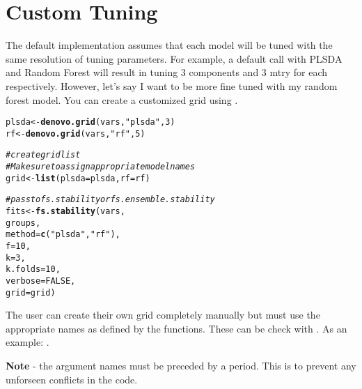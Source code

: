 \documentclass[12pt]{article}\usepackage[]{graphicx}\usepackage[usenames,dvipsnames]{color}
\makeatletter
\newcommand{\hlnum}[1]{\textcolor[rgb]{0.686,0.059,0.569}{#1}}%
\newcommand{\hlstr}[1]{\textcolor[rgb]{0.192,0.494,0.8}{#1}}%
\newcommand{\hlcom}[1]{\textcolor[rgb]{0.678,0.584,0.686}{\textit{#1}}}%
\newcommand{\hlstd}[1]{\textcolor[rgb]{0.345,0.345,0.345}{#1}}%
\newcommand{\hlkwb}[1]{\textcolor[rgb]{0.69,0.353,0.396}{#1}}%
\newcommand{\hlkwc}[1]{\textcolor[rgb]{0.333,0.667,0.333}{#1}}%
\newcommand{\hlkwd}[1]{\textcolor[rgb]{0.737,0.353,0.396}{\textbf{#1}}}%
\newenvironment{kframe}{%
 \def\at@end@of@kframe{}%
 \ifinner\ifhmode%
  \def\at@end@of@kframe{\end{minipage}}%
  \begin{minipage}{\columnwidth}%
 \fi\fi%
 \def\FrameCommand##1{\hskip\@totalleftmargin \hskip-\fboxsep
 \colorbox{shadecolor}{##1}\hskip-\fboxsep
     \hskip-\linewidth \hskip-\@totalleftmargin \hskip\columnwidth}%
 \MakeFramed {\advance\hsize-\width
   \@totalleftmargin\z@ \linewidth\hsize
   \@setminipage}}%
 {\par\unskip\endMakeFramed%
 \at@end@of@kframe}
\newenvironment{knitrout}{}{} %
\makeatother
\begin{document}
\newpage
\maketitle
\section{Custom Tuning}

The default implementation assumes that each model will be tuned with the same
resolution of tuning parameters.  For example, a default call with PLSDA and 
Random Forest will result in tuning 3 components and 3 mtry for each
respectively.  However, let's say I want to be more fine tuned with my
random forest model.  You can create a customized grid using 
.

\begin{knitrout}
\color{fgcolor}\begin{kframe}
\begin{alltt}
\hlstd{plsda} \hlkwb{<-} \hlkwd{denovo.grid}\hlstd{(vars,} \hlstr{"plsda"}\hlstd{,} \hlnum{3}\hlstd{)}
\hlstd{rf} \hlkwb{<-} \hlkwd{denovo.grid}\hlstd{(vars,} \hlstr{"rf"}\hlstd{,} \hlnum{5}\hlstd{)}

\hlcom{# create grid list}
\hlcom{# Make sure to assign appropriate model names}
\hlstd{grid} \hlkwb{<-} \hlkwd{list}\hlstd{(}\hlkwc{plsda}\hlstd{=plsda,} \hlkwc{rf}\hlstd{=rf)}

\hlcom{# pass to fs.stability or fs.ensemble.stability}
\hlstd{fits} \hlkwb{<-} \hlkwd{fs.stability}\hlstd{(vars,}
                    \hlstd{groups,}
                    \hlkwc{method} \hlstd{=} \hlkwd{c}\hlstd{(}\hlstr{"plsda"}\hlstd{,} \hlstr{"rf"}\hlstd{),}
                    \hlkwc{f} \hlstd{=} \hlnum{10}\hlstd{,}
                    \hlkwc{k} \hlstd{=} \hlnum{3}\hlstd{,}
                    \hlkwc{k.folds} \hlstd{=} \hlnum{10}\hlstd{,}
                    \hlkwc{verbose} \hlstd{=} \hlnum{FALSE}\hlstd{,}
                    \hlkwc{grid} \hlstd{= grid)}
\end{alltt}
\end{kframe}
\end{knitrout}

The user can create their own grid completely manually but must use the 
appropriate names as defined by the functions.  These can be check with 
.  As an example: .  

\textbf{Note} - the argument names must be preceded by a period.  This is to
prevent any unforseen conflicts in the code.
\end{document}
